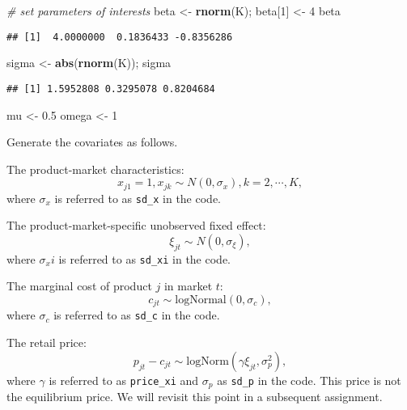 \documentclass[
]{book}
\newenvironment{Shaded}{\begin{snugshade}}{\end{snugshade}}
\newcommand{\CommentTok}[1]{\textcolor[rgb]{0.56,0.35,0.01}{\textit{#1}}}
\newcommand{\DecValTok}[1]{\textcolor[rgb]{0.00,0.00,0.81}{#1}}
\newcommand{\FloatTok}[1]{\textcolor[rgb]{0.00,0.00,0.81}{#1}}
\newcommand{\FunctionTok}[1]{\textcolor[rgb]{0.13,0.29,0.53}{\textbf{#1}}}
\newcommand{\NormalTok}[1]{#1}
\newcommand{\OtherTok}[1]{\textcolor[rgb]{0.56,0.35,0.01}{#1}}
\begin{document}
\begin{Shaded}
\begin{Highlighting}[]
\CommentTok{\# set parameters of interests}
\NormalTok{beta }\OtherTok{\textless{}{-}} \FunctionTok{rnorm}\NormalTok{(K); }
\NormalTok{beta[}\DecValTok{1}\NormalTok{] }\OtherTok{\textless{}{-}} \DecValTok{4}
\NormalTok{beta}
\end{Highlighting}
\end{Shaded}

\begin{verbatim}
## [1]  4.0000000  0.1836433 -0.8356286
\end{verbatim}

\begin{Shaded}
\begin{Highlighting}[]
\NormalTok{sigma }\OtherTok{\textless{}{-}} \FunctionTok{abs}\NormalTok{(}\FunctionTok{rnorm}\NormalTok{(K)); sigma}
\end{Highlighting}
\end{Shaded}

\begin{verbatim}
## [1] 1.5952808 0.3295078 0.8204684
\end{verbatim}

\begin{Shaded}
\begin{Highlighting}[]
\NormalTok{mu }\OtherTok{\textless{}{-}} \FloatTok{0.5}
\NormalTok{omega }\OtherTok{\textless{}{-}} \DecValTok{1}
\end{Highlighting}
\end{Shaded}

Generate the covariates as follows.

The product-market characteristics:
\[
x_{j1} = 1, x_{jk} \sim N(0, \sigma_x), k = 2, \cdots, K,
\]
where \(\sigma_x\) is referred to as \texttt{sd\_x} in the code.

The product-market-specific unobserved fixed effect:
\[
\xi_{jt} \sim N(0, \sigma_\xi),
\]
where \(\sigma_xi\) is referred to as \texttt{sd\_xi} in the code.

The marginal cost of product \(j\) in market \(t\):
\[
c_{jt} \sim \text{logNormal}(0, \sigma_c),
\]
where \(\sigma_c\) is referred to as \texttt{sd\_c} in the code.

The retail price:
\[
p_{jt} - c_{jt} \sim \text{logNorm}(\gamma \xi_{jt}, \sigma_p^2),
\]
where \(\gamma\) is referred to as \texttt{price\_xi} and \(\sigma_p\) as \texttt{sd\_p} in the code. This price is not the equilibrium price. We will revisit this point in a subsequent assignment.
\end{document}

